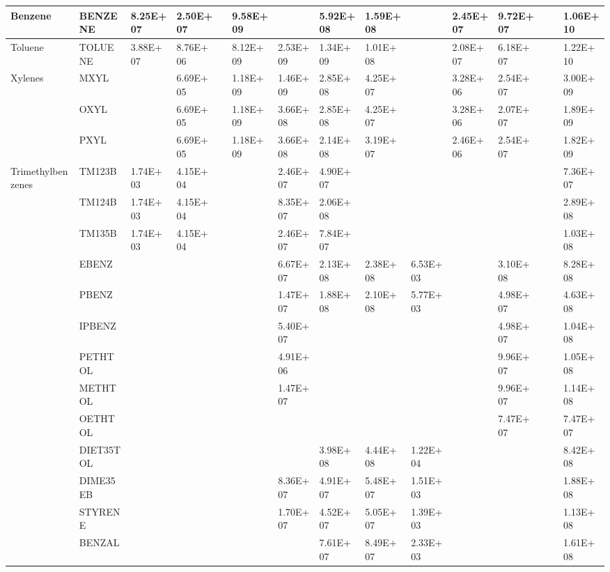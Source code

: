 \begin{longtable}{lllllllllllllll}
	Benzene & BENZENE & 8.25E+07 & 2.50E+07 &  & 9.58E+09 &  & 5.92E+08 & 1.59E+08 &  & 2.45E+07 & 9.72E+07 &  &  & 1.06E+10 \\
	\hline Toluene & TOLUENE & 3.88E+07 & 8.76E+06 &  & 8.12E+09 & 2.53E+09 & 1.34E+09 & 1.01E+08 &  & 2.08E+07 & 6.18E+07 &  &  & 1.22E+10 \\ \hline
	\multirow{3}{*}{Xylenes} & MXYL &  & 6.69E+05 &  & 1.18E+09 & 1.46E+09 & 2.85E+08 & 4.25E+07 &  & 3.28E+06 & 2.54E+07 &  &  & 3.00E+09 \\
	 & OXYL &  & 6.69E+05 &  & 1.18E+09 & 3.66E+08 & 2.85E+08 & 4.25E+07 &  & 3.28E+06 & 2.07E+07 &  &  & 1.89E+09 \\
	 & PXYL &  & 6.69E+05 &  & 1.18E+09 & 3.66E+08 & 2.14E+08 & 3.19E+07 &  & 2.46E+06 & 2.54E+07 &  &  & 1.82E+09 \\
	\hline \multirow{3}{*}{Trimethylbenzenes} & TM123B & 1.74E+03 & 4.15E+04 &  &  & 2.46E+07 & 4.90E+07 &  &  &  &  &  &  & 7.36E+07 \\
	 & TM124B & 1.74E+03 & 4.15E+04 &  &  & 8.35E+07 & 2.06E+08 &  &  &  &  &  &  & 2.89E+08 \\
	 & TM135B & 1.74E+03 & 4.15E+04 &  &  & 2.46E+07 & 7.84E+07 &  &  &  &  &  &  & 1.03E+08 \\
	\hline \parbox[t]{2mm}{} & EBENZ &  &  &  &  & 6.67E+07 & 2.13E+08 & 2.38E+08 & 6.53E+03 &  & 3.10E+08 &  &  & 8.28E+08 \\
	 & PBENZ &  &  &  &  & 1.47E+07 & 1.88E+08 & 2.10E+08 & 5.77E+03 &  & 4.98E+07 &  &  & 4.63E+08 \\
	 & IPBENZ &  &  &  &  & 5.40E+07 &  &  &  &  & 4.98E+07 &  &  & 1.04E+08 \\
	 & PETHTOL &  &  &  &  & 4.91E+06 &  &  &  &  & 9.96E+07 &  &  & 1.05E+08 \\
	 & METHTOL &  &  &  &  & 1.47E+07 &  &  &  &  & 9.96E+07 &  &  & 1.14E+08 \\
	 & OETHTOL &  &  &  &  &  &  &  &  &  & 7.47E+07 &  &  & 7.47E+07 \\
	 & DIET35TOL &  &  &  &  &  & 3.98E+08 & 4.44E+08 & 1.22E+04 &  &  &  &  & 8.42E+08 \\
	 & DIME35EB &  &  &  &  & 8.36E+07 & 4.91E+07 & 5.48E+07 & 1.51E+03 &  &  &  &  & 1.88E+08 \\
	 & STYRENE &  &  &  &  & 1.70E+07 & 4.52E+07 & 5.05E+07 & 1.39E+03 &  &  &  &  & 1.13E+08 \\
	 & BENZAL &  &  &  &  &  & 7.61E+07 & 8.49E+07 & 2.33E+03 &  &  &  &  & 1.61E+08 \\

\end{longtable}

